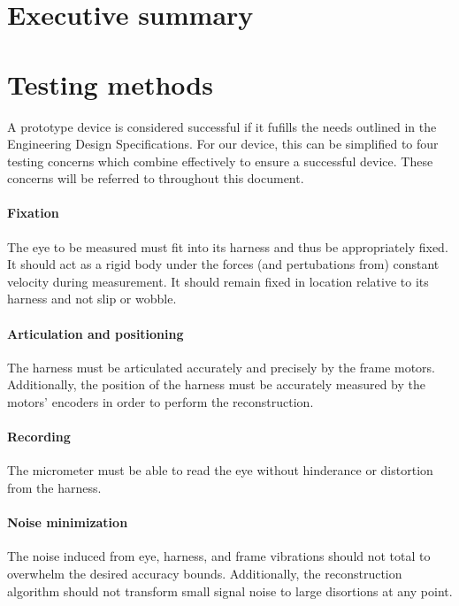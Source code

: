 \documentclass{article}
\begin{document}

\setcounter{tocdepth}{2}
\tableofcontents
\newpage

\section*{Executive summary}
\label{sec:exec-summary}


\newpage

\section{Testing methods}
\label{sec:testing-protocols}

A prototype device is considered successful if it fufills the needs
outlined in the Engineering Design Specifications. For our device,
this can be simplified to four testing concerns which combine
effectively to ensure a successful device. These concerns will be
referred to throughout this document.

\paragraph{Fixation} The eye to be measured must fit into its harness
and thus be appropriately fixed. It should act as a rigid body under
the forces (and pertubations from) constant velocity during
measurement. It should remain fixed in location relative to its
harness and not slip or wobble.

\paragraph{Articulation and positioning} The harness must be
articulated accurately and precisely by the frame
motors. Additionally, the position of the harness must be accurately
measured by the motors' encoders in order to perform the
reconstruction.

\paragraph{Recording} The micrometer must be able to read the eye
without hinderance or distortion from the harness.

\paragraph{Noise minimization} The noise induced from eye, harness,
and frame vibrations should not total to overwhelm the desired
accuracy bounds. Additionally, the reconstruction algorithm should not
transform small signal noise to large disortions at any point.
\end{document}
